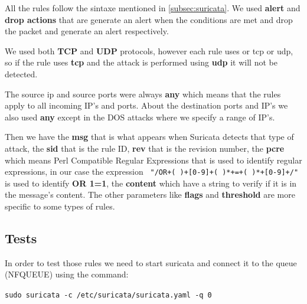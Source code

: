 \documentclass{article}
\begin{document}
All the rules follow the sintaxe mentioned in \ref{subsec:suricata}. We used \textbf{alert} and \textbf{drop actions} that are generate an alert when the conditions are met and drop the packet and generate an alert respectively.\par
We used both \textbf{TCP} and \textbf{UDP} protocols, however each rule uses or tcp or udp, so if the rule uses \textbf{tcp} and the attack is performed using \textbf{udp} it will not be detected. \par
The source ip and source ports were always \textbf{any} which means that the rules apply to all incoming IP's and ports. About the destination ports and IP's we also used \textbf{any} except in the DOS attacks where we specify a range of IP's.\par
Then we have the \textbf{msg} that is what appears when Suricata detects that type of attack, the \textbf{sid} that is the rule ID, \textbf{rev} that is the revision number, the \textbf{pcre} which means Perl Compatible Regular Expressions that is used to identify regular expressions, in our case the expression \texttt{ "/OR+( )+[0-9]+( )*+=+( )*+[0-9]+/"} is used to identify \textbf{OR 1=1}, the \textbf{content} which have a string to verify if it is in the message's content. The other parameters like \textbf{flags} and \textbf{threshold} are more specific to some types of rules.


\subsection{Tests}

In order to test those rules we need to start suricata and connect it to the queue (NFQUEUE) using the command:\par
\texttt{}\par
\texttt{sudo suricata -c /etc/suricata/suricata.yaml -q 0}\par
\texttt{}\par
\end{document}
